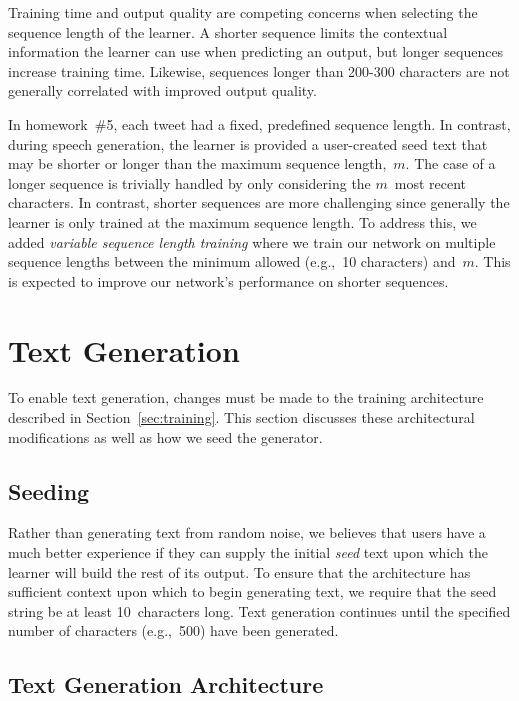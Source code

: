 \documentclass{article}
\begin{document}
Training time and output quality are competing concerns when selecting the sequence length of the learner.  A shorter sequence limits the contextual information the learner can use when predicting an output, but longer sequences increase training time.  Likewise, sequences longer than 200-300 characters are not generally correlated with improved output quality.

In homework~\#5, each tweet had a fixed, predefined sequence length.  In contrast, during speech generation, the learner is provided a user-created seed text that may be shorter or longer than the maximum sequence length,~$m$.  The case of a longer sequence is trivially handled by only considering the $m$~most recent characters.  In contrast, shorter sequences are more challenging since generally the learner is only trained at the maximum sequence length.  To address this, we added \textit{variable sequence length training} where we train our network on multiple sequence lengths between the minimum allowed (e.g.,~10 characters) and~$m$.  This is expected to improve our network's performance on shorter sequences.

\section{Text Generation}

To enable text generation, changes must be made to the training architecture described in Section~\ref{sec:training}.  This section discusses these architectural modifications as well as how we seed the generator.

\subsection{Seeding}

Rather than generating text from random noise, we believes that users have a much better experience if they can supply the initial \textit{seed} text upon which the learner will build the rest of its output.  To ensure that the architecture has sufficient context upon which to begin generating text, we require that the seed string be at least 10~characters long.  Text generation continues until the specified number of characters (e.g.,~500) have been generated.

\subsection{Text Generation Architecture}\label{sec:generationRnnArchitecture}
\end{document}
